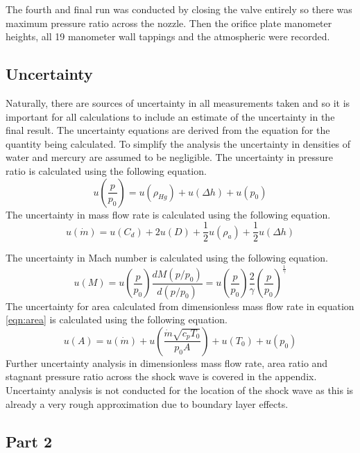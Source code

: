 \documentclass{article}
\begin{document}
The fourth and final run was conducted by closing the valve entirely so there was maximum pressure ratio across the nozzle.
Then the orifice plate manometer heights, all 19 manometer wall tappings and the atmospheric were recorded.

\subsection{Uncertainty}

Naturally, there are sources of uncertainty in all measurements taken and so it is important for all calculations to include an estimate of the uncertainty in the final result.
The uncertainty equations are derived from the equation for the quantity being calculated.
To simplify the analysis the uncertainty in densities of water and mercury are assumed to be negligible.
The uncertainty in pressure ratio is calculated using the following equation.
\begin{equation}
    u\left( \frac{p}{p_0} \right) = u(\rho_{Hg}) + u(\Delta h) + u(p_0)
\end{equation}
The uncertainty in mass flow rate is calculated using the following equation.
\begin{equation}
    u(\dot{m}) = u(C_d) + 2u(D) + \frac{1}{2}u(\rho_a) + \frac{1}{2}u(\Delta h)
\end{equation}

The uncertainty in Mach number is calculated using the following equation.
\begin{equation}
    u(M) = u\left( \frac{p}{p_0} \right) \frac{d M ( p/p_0 ) }{d (p/p_0)} = u\left(\frac{p}{p_0}\right) \frac{2}{\gamma}  \left( \frac{p}{p_0} \right) ^ {\frac{1}{\gamma}}
\end{equation}
The uncertainty for area calculated from dimensionless mass flow rate in equation \ref{eqn:area} is calculated using the following equation.
\begin{equation}
    u(A) = u(\dot{m}) + u\left(\frac{\dot{m}\sqrt{c_pT_0}}{p_0A}\right) + u(T_0) + u(p_0)
\end{equation}
Further uncertainty analysis in dimensionless mass flow rate, area ratio and stagnant pressure ratio across the shock wave is covered in the appendix.
Uncertainty analysis is not conducted for the location of the shock wave as this is already a very rough approximation due to boundary layer effects.

\subsection{Part 2}
\end{document}
